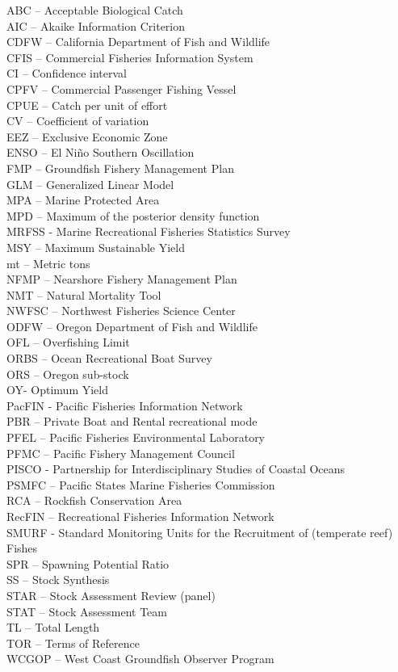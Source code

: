 \documentclass[11pt,
  english,
  letterpaper,
]{article}
\begin{document}
ABC -- Acceptable Biological Catch\\
AIC -- Akaike Information Criterion\\
CDFW -- California Department of Fish and Wildlife\\
CFIS -- Commercial Fisheries Information System\\
CI -- Confidence interval\\
CPFV -- Commercial Passenger Fishing Vessel\\
CPUE -- Catch per unit of effort\\
CV -- Coefficient of variation\\
EEZ -- Exclusive Economic Zone\\
ENSO -- El Niño Southern Oscillation\\
FMP -- Groundfish Fishery Management Plan\\
GLM -- Generalized Linear Model\\
MPA -- Marine Protected Area\\
MPD -- Maximum of the posterior density function\\
MRFSS - Marine Recreational Fisheries Statistics Survey\\
MSY -- Maximum Sustainable Yield\\
mt -- Metric tons\\
NFMP -- Nearshore Fishery Management Plan\\
NMT -- Natural Mortality Tool\\
NWFSC -- Northwest Fisheries Science Center\\
ODFW -- Oregon Department of Fish and Wildlife\\
OFL -- Overfishing Limit\\
ORBS -- Ocean Recreational Boat Survey\\
ORS -- Oregon sub-stock\\
OY- Optimum Yield\\
PacFIN - Pacific Fisheries Information Network\\
PBR -- Private Boat and Rental recreational mode\\
PFEL -- Pacific Fisheries Environmental Laboratory\\
PFMC -- Pacific Fishery Management Council\\
PISCO - Partnership for Interdisciplinary Studies of Coastal Oceans\\
PSMFC -- Pacific States Marine Fisheries Commission\\
RCA -- Rockfish Conservation Area\\
RecFIN -- Recreational Fisheries Information Network\\
SMURF - Standard Monitoring Units for the Recruitment of (temperate reef) Fishes\\
SPR -- Spawning Potential Ratio\\
SS -- Stock Synthesis\\
STAR -- Stock Assessment Review (panel)\\
STAT -- Stock Assessment Team\\
TL -- Total Length\\
TOR -- Terms of Reference\\
WCGOP -- West Coast Groundfish Observer Program
\end{document}
